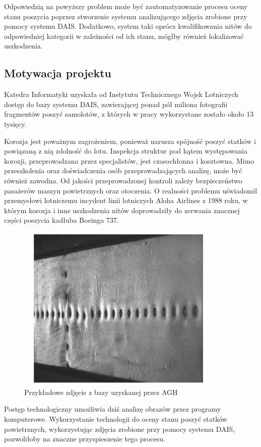 \documentclass[polish,12pt]{aghthesis}
\begin{document}
\par
Odpowiedzią na powyższy problem może być zautomatyzowanie procesu oceny stanu poszycia poprzez stworzenie systemu analizującego zdjęcia zrobione przy pomocy systemu DAIS. Dodatkowo, system taki oprócz kwalifikowania nitów do odpowiedniej kategorii w zależności od ich stanu, mógłby również lokalizować uszkodzenia.

\subsection{Motywacja projektu}
Katedra Informatyki uzyskała od Instytutu Technicznego Wojsk Lotniczych dostęp do bazy systemu DAIS, zawierającej ponad pół miliona fotografii fragmentów poszyć samolotów, z których w pracy wykorzystane zostało około 13 tysięcy.
\par
Korozja jest poważnym zagrożeniem, ponieważ narusza spójność poszyć statków i powiązaną z nią zdolność do lotu. Inspekcja struktur pod kątem występowania korozji, przeprowadzana przez specjalistów, jest czasochłonna i kosztowna. Mimo przeszkolenia oraz doświadczenia osób przeprowadzających analizę, może być również zawodna. Od jakości przeprowadzonej kontroli zależy bezpieczeństwo pasażerów maszyn powietrznych oraz otoczenia. O realności problemu uświadomił przemysłowi lotniczemu incydent linii lotniczych Aloha Airlines z 1988 roku, w którym korozja i inne uszkodzenia nitów doprowadziły do zerwania znacznej części poszycia kadłuba Boeinga 737. 
\begin{figure} [h!]
  \centering
  \includegraphics[width=10cm, height=8cm]{images/dais-agh.PNG}
  \caption{Przykładowe zdjęcie z bazy uzyskanej przez AGH}
  \label{fig:dais-agh}
\end{figure}
\par
Postęp technologiczny umożliwia dziś analizę obrazów przez programy komputerowe. Wykorzystanie technologii do oceny stanu poszyć statków powietrznych, wykorzystując zdjęcia zrobione przy pomocy systemu DAIS, pozwoliłoby na znaczne przyspieszenie tego procesu.
\end{document}
